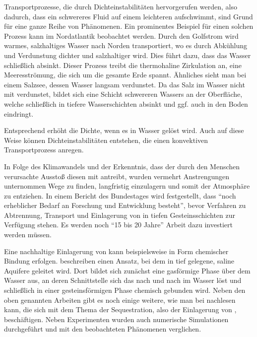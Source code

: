 
\label{cha:intro}


Transportprozesse, die durch Dichteinstabilitäten hervorgerufen werden, also dadurch, dass ein schwereres Fluid auf einem leichteren aufschwimmt, sind Grund für eine ganze Reihe von Phänomenen.
Ein prominentes Beispiel für einen solchen Prozess kann im Nordatlantik beobachtet werden. Durch den Golfstrom wird warmes, salzhaltiges Wasser nach Norden transportiert, wo es durch Abkühlung und Verdunstung dichter und salzhaltiger wird. Dies führt dazu, dass das Wasser schließlich absinkt. Dieser Prozess treibt die thermohaline Zirkulation an, eine Meeresströmung, die sich um die gesamte Erde spannt. 
Ähnliches sieht man bei einem Salzsee, dessen Wasser langsam verdunstet. Da das Salz im Wasser nicht mit verdunstet, bildet sich eine Schicht schwereren Wassers an der Oberfläche, welche schließlich in tiefere Wasserschichten absinkt und ggf. auch in den Boden eindringt.

Entsprechend erhöht \COT die Dichte, wenn es in Wasser gelöst wird. Auch auf diese Weise können Dichteinstabilitäten entstehen, die einen konvektiven Transportprozess anregen.

In Folge des Klimawandels und der Erkenntnis, dass der durch den Menschen verursachte \COTm Ausstoß diesen mit antreibt, wurden vermehrt Anstrengungen unternommen Wege zu finden, \COT langfristig einzulagern und somit der Atmosphäre zu entziehen. 
In einem Bericht des Bundestages \citep{taccs} wird festgestellt, dass ``noch erheblicher Bedarf an Forschung und Entwicklung besteht'', bevor Verfahren zu Abtrennung, Transport und Einlagerung von \COT in tiefen Gesteinsschichten zur Verfügung stehen. Es werden noch ``15 bis 20 Jahre'' Arbeit dazu investiert werden müssen.

Eine nachhaltige Einlagerung von \COT kann beispielsweise in Form chemischer Bindung erfolgen. \cite{kneafsy} beschreiben einen Ansatz, bei dem \COT in tief gelegene, saline Aquifere geleitet wird. Dort bildet sich zunächst eine gasförmige Phase über dem Wasser aus, an deren Schnittstelle sich das \COT nach und nach im Wasser löst und schließlich in einer gesteinsförmigen Phase chemisch gebunden wird.  Neben den oben genannten Arbeiten gibt es noch einige weitere, wie man bei \cite{kneafsy} nachlesen kann, die sich mit dem Thema der \COTm Sequestration, also der Einlagerung von \COT, beschäftigen. Neben Experimenten wurden auch numerische Simulationen durchgeführt und mit den beobachteten Phänomenen verglichen. 

